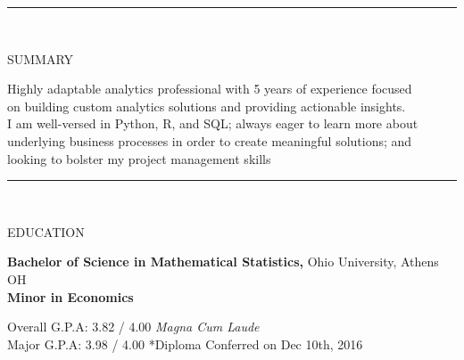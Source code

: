\documentclass[12pt]{article}
\newcommand{\tab}[1][1cm]{\hspace*{#1}}
\newcommand{\header}[1]{
    \vspace*{-2mm}
    \rule{6.5in}{3pt} \\
    \smallskip
    \begin{large}
	    \textsc{\textcolor{lblue}{#1}}
    \end{large}
    \bigskip
}
\begin{document}
  \pagestyle{empty} %

  \begin{flushleft}
    \header{SUMMARY}

    \tab Highly adaptable analytics professional with 5 years of experience focused \\
    \tab on building custom analytics solutions and providing actionable insights. \\
    \tab I am well-versed in Python, R, and SQL; always eager to learn more about \\
    \tab underlying business processes in order to create meaningful solutions; and \\
    \tab looking to bolster my project management skills \

    \smallskip
  \end{flushleft}
  
  \begin{flushleft}
    \header{EDUCATION}

    \textbf{Bachelor of Science in Mathematical Statistics,} \hfill Ohio University, Athens OH \\
    \textbf{Minor in Economics}

    \tab[0.5cm] Overall G.P.A:  3.82 / 4.00 \tab[0.25cm] \textit{Magna Cum Laude} \\
    \tab[0.5cm] \hspace*{2.08mm}Major G.P.A: 3.98 / 4.00  \hfill \small{*Diploma Conferred on Dec 10th, 2016}

    \smallskip
  \end{flushleft}
\end{document}
